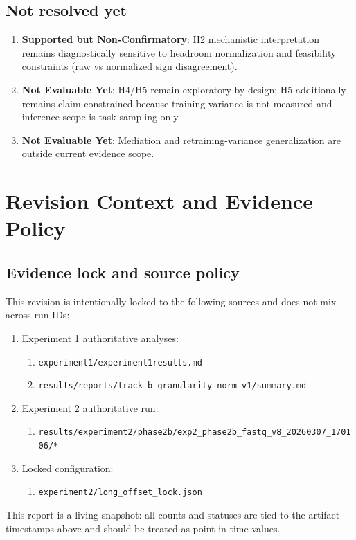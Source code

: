 \documentclass[11pt]{article}
\newcommand{\statusSupported}{\textbf{Supported but Non-Confirmatory}}
\newcommand{\statusNotEval}{\textbf{Not Evaluable Yet}}
\begin{document}
\subsection*{Not resolved yet}
\begin{enumerate}[leftmargin=*]
  \item \statusSupported: H2 mechanistic interpretation remains diagnostically sensitive to headroom normalization and feasibility constraints (raw vs normalized sign disagreement).
  \item \statusNotEval: H4/H5 remain exploratory by design; H5 additionally remains claim-constrained because training variance is not measured and inference scope is task-sampling only.
  \item \statusNotEval: Mediation and retraining-variance generalization are outside current evidence scope.
\end{enumerate}

\section{Revision Context and Evidence Policy}
\subsection*{Evidence lock and source policy}
This revision is intentionally locked to the following sources and does not mix across run IDs:
\begin{enumerate}[leftmargin=*]
  \item Experiment 1 authoritative analyses:
  \begin{enumerate}
    \item \texttt{experiment1/experiment1results.md}
    \item \texttt{results/reports/track\_b\_granularity\_norm\_v1/summary.md}
  \end{enumerate}
  \item Experiment 2 authoritative run:
  \begin{enumerate}
    \item \texttt{results/experiment2/phase2b/exp2\_phase2b\_fastq\_v8\_20260307\_170106/*}
  \end{enumerate}
  \item Locked configuration:
  \begin{enumerate}
    \item \texttt{experiment2/long\_offset\_lock.json}
  \end{enumerate}
\end{enumerate}
This report is a living snapshot: all counts and statuses are tied to the artifact timestamps above and should be treated as point-in-time values.
\end{document}
